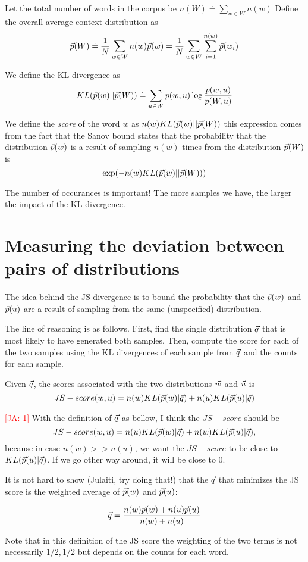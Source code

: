 \documentclass{article}
\newcommand{\authcmt}[2]{\textcolor{#1}{#2}}
\newcommand{\julaiti}[1]{\authcmt{red}{[JA: #1]}}
\begin{document}
Let the total number of words in the corpus be $n(W) \doteq \sum_{w \in W} n(w)$
Define the overall average context distribution as
\[
\vec{p}(W) \doteq \frac{1}{N} \sum_{w \in W} n(w) \vec{p}(w) = \frac{1}{N}
\sum_{w \in W} \sum_{i=1}^{n(w)} \vec{p}(w_i)
\]

We define the KL divergence as
\[
KL(\vec{p}(w) || \vec{p}(W)) \doteq \sum_{u \in W} p(w,u) \log \frac{p(w,u)}{p(W,u)}
\]

We define the {\em score} of the word $w$ as $n(w) KL(\vec{p}(w)||\vec{p}(W))$
this expression comes from the fact that the Sanov bound states that
the probability that the distribution $\vec{p}(w)$ is a result of sampling
$n(w)$ times from the distribution $\vec{p}(W)$ is 
$$\exp(- n(w) KL(\vec{p}(w)||\vec{p}(W)))$$

The number of occurances is important! The more samples we have, the
larger the impact of the KL divergence.

\section{Measuring the deviation between pairs of distributions}

The idea behind the JS divergence is to bound the probability that
the $\vec{p}(w)$ and $\vec{p}(u)$ are a result of sampling from the same
(unspecified) distribution.

The line of reasoning is as follows. First, find the single
distribution $\vec{q}$ that is most likely to have generated both samples. Then,
compute the score for each of the two samples using the KL divergences
of each sample from $\vec{q}$ and the counts for each sample.

Given $\vec{q}$, the scores associated with the two distributions $\vec{w}$
and $\vec{u}$ is 
\[
JS-score(w,u) = n(w) KL(\vec{p}(w) | \vec{q}) +n(u) KL(\vec{p}(u) | \vec{q})
\]

\julaiti 1
With the definition of $\vec{q}$ as bellow, I think the $JS-score$ should be
\[
JS-score(w,u) = n(u) KL(\vec{p}(w) | \vec{q}) + n(w) KL(\vec{p}(u) | \vec{q}),
\]
because in case $n(w) >> n(u)$, we want the $JS-score$ to be close to
$KL(\vec{p}(u) | \vec{q})$. If we go other way around, it will be close to $0$.

It is not hard to show (Julaiti, try doing that!) that the $\vec{q}$ that
minimizes the JS score is the weighted average of $\vec{p}(w)$ and
$\vec{p}(u)$:

\[
\vec{q} = \frac{n(w)\vec{p}(w) + n(u) \vec{p}(u)}{n(w)+n(u)}
\]

Note that in this definition of the JS score the weighting of the two
terms is not necessarily $1/2,1/2$ but depends on the counts for each
word.
\end{document}

